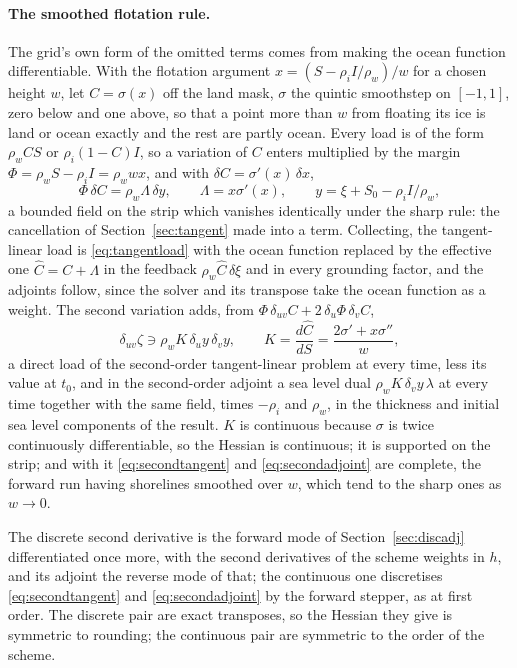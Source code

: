 \documentclass[11pt,a4paper]{article}
\numberwithin{equation}{section}
\begin{document}
\paragraph{The smoothed flotation rule.} The grid's own form of the omitted
terms comes from making the ocean function differentiable. With the
flotation argument $x = (S - \rho_i I/\rho_w)/w$ for a chosen height $w$,
let $C = \sigma(x)$ off the land mask, $\sigma$ the quintic smoothstep on
$[-1,1]$, zero below and one above, so that a point more than $w$ from
floating its ice is land or ocean exactly and the rest are partly ocean.
Every load is of the form $\rho_w C S$ or $\rho_i(1-C)I$, so a variation of
$C$ enters multiplied by the margin $\Phi = \rho_w S - \rho_i I = \rho_w w x$,
and with $\delta C = \sigma'(x)\,\delta x$,
\begin{equation}
\Phi\,\delta C = \rho_w\Lambda\,\delta y,\qquad
\Lambda = x\sigma'(x),\qquad y = \xi + S_0 - \rho_i I/\rho_w,
\end{equation}
a bounded field on the strip which vanishes identically under the sharp
rule: the cancellation of Section~\ref{sec:tangent} made into a term.
Collecting, the tangent-linear load is \eqref{eq:tangentload} with the
ocean function replaced by the effective one $\hat C = C + \Lambda$ in the
feedback $\rho_w\hat C\,\delta\xi$ and in every grounding factor, and the
adjoints follow, since the solver and its transpose take the ocean function
as a weight. The second variation adds, from $\Phi\,\delta_{uv}C +
2\,\delta_u\Phi\,\delta_v C$,
\begin{equation}
\delta_{uv}\zeta \ni \rho_w K\,\delta_u y\,\delta_v y,\qquad
K = \frac{d\hat C}{dS} = \frac{2\sigma' + x\sigma''}{w},
\end{equation}
a direct load of the second-order tangent-linear problem at every time,
less its value at $t_0$, and in the second-order adjoint a sea level dual
$\rho_w K\,\delta_v y\,\lambda$ at every time together with the same field,
times $-\rho_i$ and $\rho_w$, in the thickness and initial sea level
components of the result. $K$ is continuous because $\sigma$ is twice
continuously differentiable, so the Hessian is continuous; it is supported
on the strip; and with it \eqref{eq:secondtangent} and
\eqref{eq:secondadjoint} are complete, the forward run having shorelines
smoothed over $w$, which tend to the sharp ones as $w \to 0$.

The discrete second derivative is the forward mode of
Section~\ref{sec:discadj} differentiated once more, with the second
derivatives of the scheme weights in $h$, and its adjoint the reverse mode
of that; the continuous one discretises \eqref{eq:secondtangent} and
\eqref{eq:secondadjoint} by the forward stepper, as at first order. The
discrete pair are exact transposes, so the Hessian they give is symmetric to
rounding; the continuous pair are symmetric to the order of the scheme.
\end{document}
